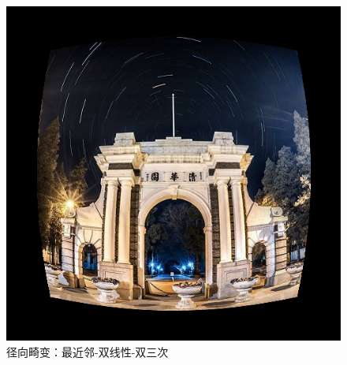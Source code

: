 \documentclass[UTF8]{ctexart}
\begin{document}
\begin{figure}[H]
    \includegraphics[scale=0.2]{images/report-images/radical_distortionbicub.png}
    \caption{径向畸变：最近邻-双线性-双三次}
\end{figure}
\end{document}
